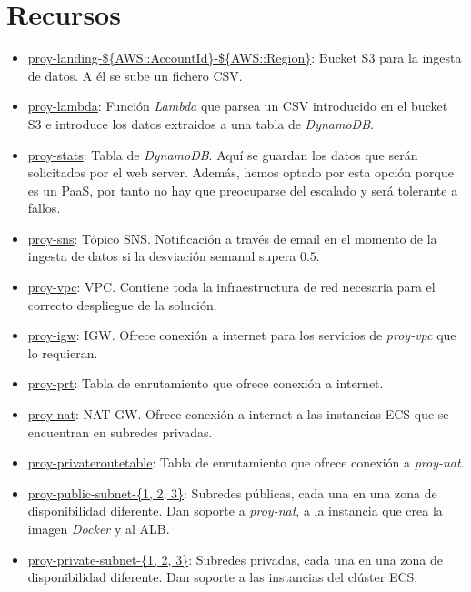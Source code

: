 \section{Recursos}

\begin{itemize}
    \item \underline{proy-landing-\$\{AWS::AccountId\}-\$\{AWS::Region\}}: Bucket S3 para la ingesta de datos. A él se sube un fichero CSV.

    \item \underline{proy-lambda}: Función \textit{Lambda} que parsea un CSV introducido en el bucket S3 e introduce los datos extraidos a una tabla de \textit{DynamoDB}.

    \item \underline{proy-stats}: Tabla de \textit{DynamoDB}. Aquí se guardan los datos que serán solicitados por el web server. Además, hemos optado por esta opción porque es un PaaS, por tanto no hay que preocuparse del escalado y será tolerante a fallos.

    \item \underline{proy-sns}: Tópico SNS. Notificación a través de email en el momento de la ingesta de datos si la desviación semanal supera $0.5$.

    \item \underline{proy-vpc}: VPC. Contiene toda la infraestructura de red necesaria para el correcto despliegue de la solución.

    \item \underline{proy-igw}: IGW. Ofrece conexión a internet para los servicios de \textit{proy-vpc} que lo requieran.

    \item \underline{proy-prt}: Tabla de enrutamiento que ofrece conexión a internet.

    \item \underline{proy-nat}: NAT GW. Ofrece conexión a internet a las instancias ECS que se encuentran en subredes privadas.

    \item \underline{proy-privateroutetable}: Tabla de enrutamiento que ofrece conexión a \textit{proy-nat}.

    \item \underline{proy-public-subnet-\{1, 2, 3\}}: Subredes públicas, cada una en una zona de disponibilidad diferente. Dan soporte a \textit{proy-nat}, a la instancia que crea la imagen \textit{Docker} y al ALB.

    \item \underline{proy-private-subnet-\{1, 2, 3\}}: Subredes privadas, cada una en una zona de disponibilidad diferente. Dan soporte a las instancias del clúster ECS.


\end{itemize}
